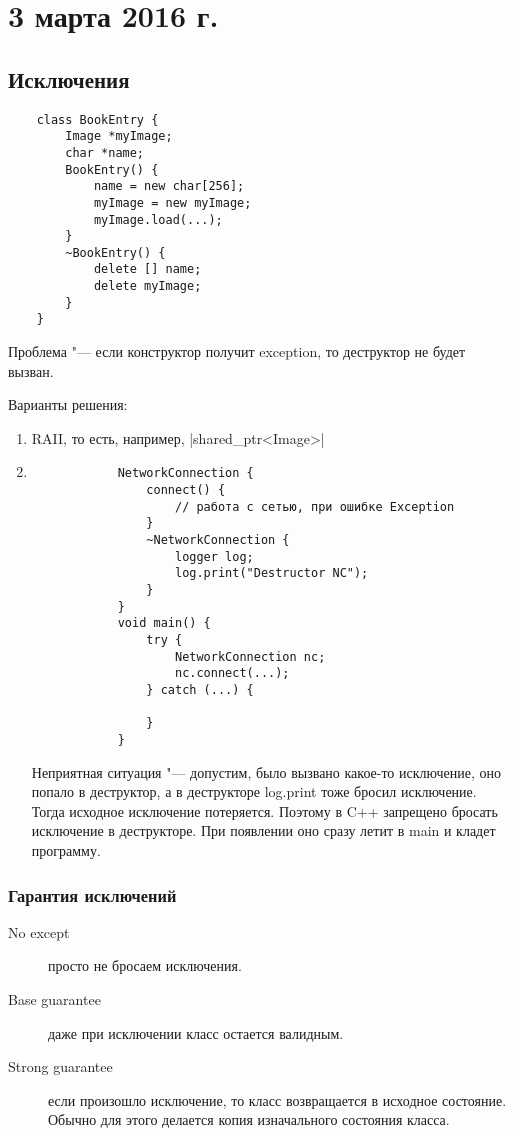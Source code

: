 \section{3 марта 2016 г.}

\subsection{Исключения}

\begin{verbatim}
    class BookEntry {
        Image *myImage;
        char *name;
        BookEntry() {
            name = new char[256];
            myImage = new myImage;
            myImage.load(...);
        }
        ~BookEntry() {
            delete [] name;
            delete myImage;
        }
    }
\end{verbatim}
Проблема "--- если конструктор получит exception, то деструктор не будет вызван.

Варианты решения:
\begin{enumerate}
    \item RAII, то есть, например, |shared_ptr<Image>|
    \item 
        \begin{verbatim}
            NetworkConnection {
                connect() {
                    // работа с сетью, при ошибке Exception
                }
                ~NetworkConnection {
                    logger log;
                    log.print("Destructor NC");
                }
            }
            void main() {
                try {
                    NetworkConnection nc;
                    nc.connect(...);
                } catch (...) {

                }
            }
        \end{verbatim}
        Неприятная ситуация "--- допустим, было вызвано какое-то исключение, оно попало в деструктор, а в деструкторе log.print тоже бросил исключение. Тогда исходное исключение потеряется. Поэтому в C++ запрещено бросать исключение в деструкторе. При появлении оно сразу летит в main и кладет программу.
\end{enumerate}

\subsubsection{Гарантия исключений}
\begin{description}
    \item[No except] просто не бросаем исключения.
    \item[Base guarantee] даже при исключении класс остается валидным.
    \item[Strong guarantee] если произошло исключение, то класс возвращается в исходное состояние. Обычно для этого делается копия изначального состояния класса.
\end{description}

